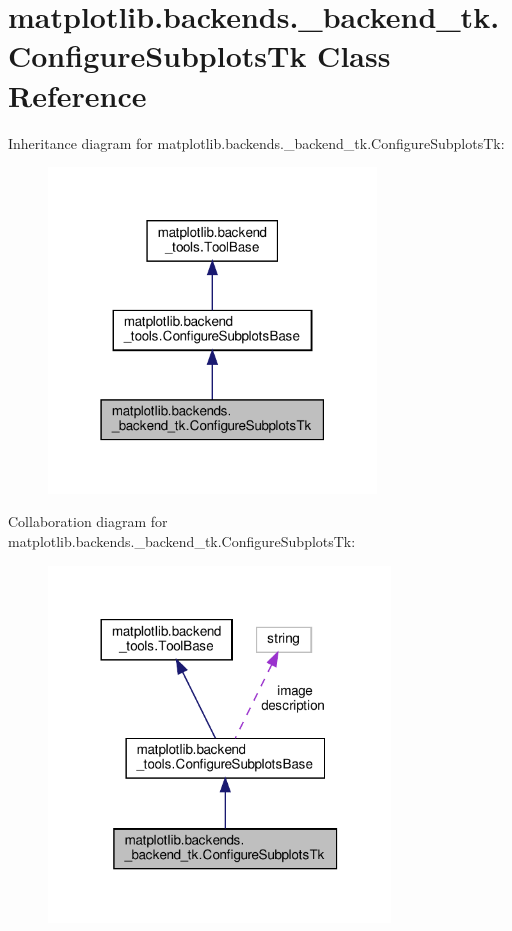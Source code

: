 \hypertarget{classmatplotlib_1_1backends_1_1__backend__tk_1_1ConfigureSubplotsTk}{}\section{matplotlib.\+backends.\+\_\+backend\+\_\+tk.\+Configure\+Subplots\+Tk Class Reference}
\label{classmatplotlib_1_1backends_1_1__backend__tk_1_1ConfigureSubplotsTk}


Inheritance diagram for matplotlib.\+backends.\+\_\+backend\+\_\+tk.\+Configure\+Subplots\+Tk\+:
\nopagebreak
\begin{figure}[H]
\begin{center}
\leavevmode
\includegraphics[width=247pt]{classmatplotlib_1_1backends_1_1__backend__tk_1_1ConfigureSubplotsTk__inherit__graph}
\end{center}
\end{figure}


Collaboration diagram for matplotlib.\+backends.\+\_\+backend\+\_\+tk.\+Configure\+Subplots\+Tk\+:
\nopagebreak
\begin{figure}[H]
\begin{center}
\leavevmode
\includegraphics[width=257pt]{classmatplotlib_1_1backends_1_1__backend__tk_1_1ConfigureSubplotsTk__coll__graph}
\end{center}
\end{figure}
